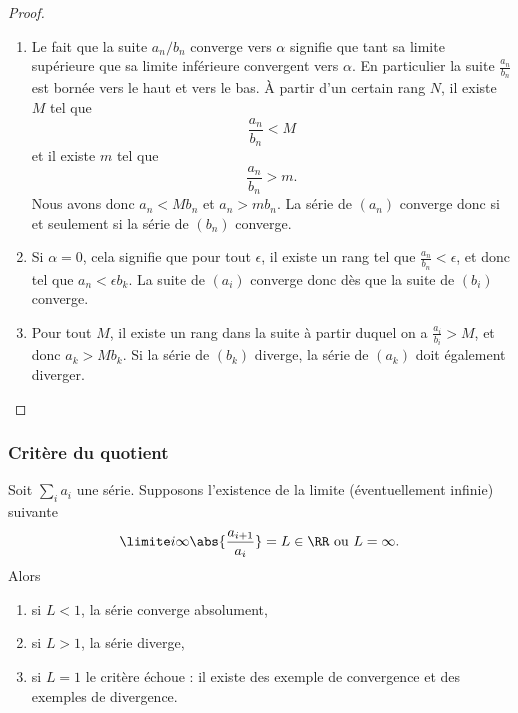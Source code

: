 \begin{proof}
\begin{enumerate}
	\item
		Le fait que la suite $a_n/b_n$ converge vers $\alpha$ signifie que tant sa limite supérieure que sa limite inférieure convergent vers $\alpha$. En particulier la suite $\frac{ a_n }{ b_n }$ est bornée vers le haut et vers le bas. À partir d'un certain rang $N$, il existe $M$ tel que 
		\begin{equation}
			\frac{ a_n }{ b_n }<M
		\end{equation}
		et il existe $m$ tel que
		\begin{equation}
			\frac{ a_n }{ b_n }>m.
		\end{equation}
		Nous avons donc $a_n<Mb_n$ et $a_n>mb_n$. La série de $(a_n)$ converge donc si et seulement si la série de $(b_n)$ converge.
	\item
		Si $\alpha=0$, cela signifie que pour tout $\epsilon$, il existe un rang tel que $\frac{ a_n }{ b_n }<\epsilon$, et donc tel que $a_n<\epsilon b_k$. La suite de $(a_i)$ converge donc dès que la suite de $(b_i)$ converge.
	\item
		Pour tout $M$, il existe un rang dans la suite à partir duquel on a $\frac{ a_i }{ b_i }>M$, et donc $a_k>Mb_k$. Si la série de $(b_k)$ diverge, la série de $(a_k)$ doit également diverger.
\end{enumerate}
\end{proof}

\subsubsection{Critère du quotient}

\begin{proposition}
    Soit $\sum_i a_i$ une série. Supposons l'existence de la limite (éventuellement infinie) suivante
    \begin{equation}
      \limite i \infty \abs{\frac{a_{i+1}}{a_i}} = L\in \RR \text{ ou $L =
        \infty$.}
    \end{equation}
    Alors
    \begin{enumerate}
    \item si $L < 1$, la série converge absolument,
    \item si $L > 1$, la série diverge,
    \item si $L = 1$ le critère échoue : il existe des exemple de convergence et des exemples de divergence.
    \end{enumerate}
\end{proposition}

